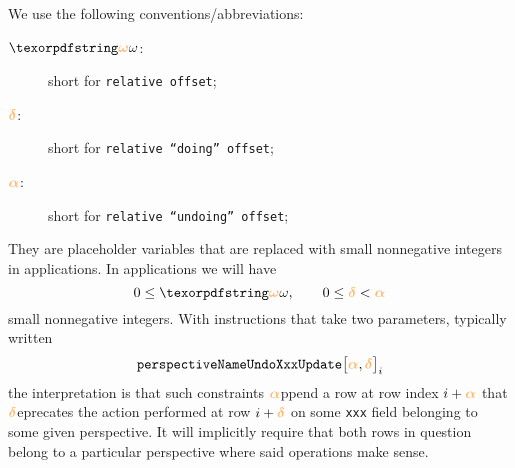We use the following conventions/abbreviations:
\begin{description}
	\item[\qquad$\relof$:] 
		short for \texttt{relative offset};
	\item[\qquad$\reldo$:] 
		short for \texttt{relative ``doing'' offset};
	\item[\qquad$\reluo$:] 
		short for \texttt{relative ``undoing'' offset};
\end{description}
They are placeholder variables that are replaced with small nonnegative integers in applications.
In applications we will have
\[
	0 \leq \relof, \qquad 0\leq \reldo < \reluo
\]
small nonnegative integers. With instructions that take two parameters, typically written
\[
	\texttt{perspectiveNameUndoXxxUpdate}\big[\reluo, \reldo\big]_{i}
\]
the interpretation is that such constraints $\reluo$ppend a row at row index $i + \reluo$ that $\reldo$eprecates the action performed at row $i + \reldo$ on some \texttt{xxx} field belonging to some given perspective.
It will implicitly require that both rows in question belong to a particular perspective where said operations make sense.

